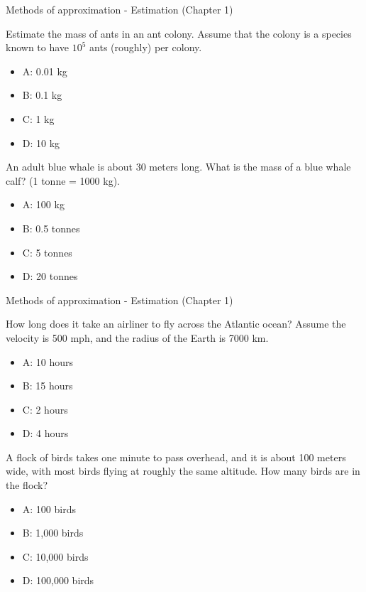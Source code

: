 \documentclass{beamer}
\begin{document}
\begin{frame}{Methods of approximation - Estimation (Chapter 1)}
\small
\begin{minipage}[b]{0.45\linewidth}
Estimate the mass of ants in an ant colony.  Assume that the colony is a species known to have $10^5$ ants (roughly) per colony.
\begin{itemize}
\item A: 0.01 kg
\item B: 0.1 kg
\item C: 1 kg
\item D: 10 kg
\end{itemize}
\end{minipage}
\hspace{0.5cm}
\begin{minipage}[b]{0.45\linewidth}
An adult blue whale is about 30 meters long.  What is the mass of a blue whale calf? (1 tonne = 1000 kg).
\vspace{0.55cm}
\begin{itemize}
\item A: 100 kg
\item B: 0.5 tonnes
\item C: 5 tonnes
\item D: 20 tonnes
\end{itemize}
\end{minipage}
\end{frame}

\begin{frame}{Methods of approximation - Estimation (Chapter 1)}
\small
\begin{minipage}[b]{0.45\linewidth}
How long does it take an airliner to fly across the Atlantic ocean?  Assume the velocity is 500 mph, and the radius of the Earth is 7000 km.
\vspace{0.6cm}
\begin{itemize}
\item A: 10 hours
\item B: 15 hours
\item C: 2 hours
\item D: 4 hours
\end{itemize}
\end{minipage}
\hspace{0.5cm}
\begin{minipage}[b]{0.45\linewidth}
A flock of birds takes one minute to pass overhead, and it is about 100 meters wide, with most birds flying at roughly the same altitude.  How many birds are in the flock?
\vspace{0.1cm}
\begin{itemize}
\item A: 100 birds
\item B: 1,000 birds
\item C: 10,000 birds
\item D: 100,000 birds
\end{itemize}
\end{minipage}
\end{frame}
\end{document}
